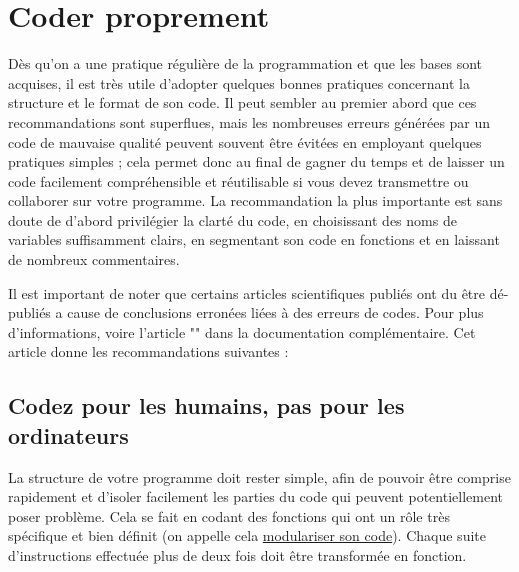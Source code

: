 \documentclass{article}
\begin{document}



\section{Coder proprement}

Dès qu'on a une pratique régulière de la programmation et que les bases sont acquises, il est très utile d'adopter quelques bonnes pratiques concernant la structure et le format de son code. Il peut sembler au premier abord que ces recommandations sont superflues, mais les nombreuses erreurs générées par un code de mauvaise qualité peuvent souvent être évitées en employant quelques pratiques simples ; cela permet donc au final de gagner du temps et de laisser un code facilement compréhensible et réutilisable si vous devez transmettre ou collaborer sur votre programme. La recommandation la plus importante est sans doute de d'abord privilégier la clarté du code, en choisissant des noms de variables suffisamment clairs, en segmentant son code en fonctions et en laissant de nombreux commentaires.

Il est important de noter que certains articles scientifiques publiés ont du être dé-publiés a cause de conclusions erronées liées à des erreurs de codes. Pour plus d'informations, voire l'article "" dans la documentation complémentaire. Cet article donne les recommandations suivantes :

\subsection{Codez pour les humains, pas pour les ordinateurs}
La structure de votre programme doit rester simple, afin de pouvoir être comprise rapidement et d'isoler facilement les parties du code qui peuvent potentiellement poser problème. Cela se fait en codant des fonctions qui ont un rôle très spécifique et bien définit (on appelle cela \href{https://fr.wikipedia.org/wiki/Programmation_modulaire}{modulariser son code}). Chaque suite d'instructions effectuée plus de deux fois doit être transformée en fonction.
\end{document}
